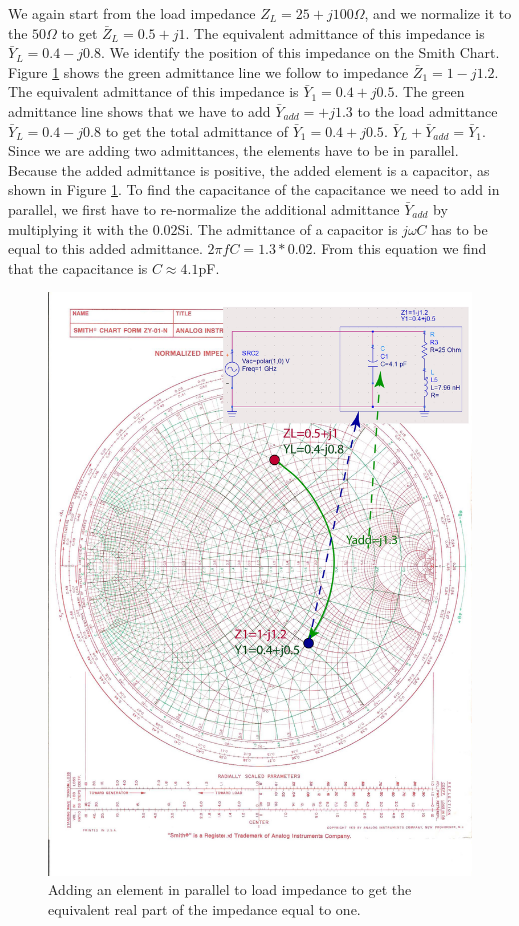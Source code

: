 \documentclass{ximera}
\begin{document}
We again start from the load impedance  $Z_L=25+j 100 \Omega$, and we normalize it to the $50 \Omega$ to get $\bar{Z}_L=0.5+j1$. The equivalent admittance of this impedance is $\bar{Y}_L=0.4-j0.8$. We identify the position of this impedance on the Smith Chart. Figure \ref{fig:LumpedImpM1} shows the green admittance line we follow to impedance $\bar{Z}_1=1-j1.2$. The equivalent admittance of this impedance is   $\bar{Y}_1=0.4+j0.5$. The green admittance line shows that we have to add $\bar{Y}_{add}=+j1.3$ to the load admittance $\bar{Y}_L=0.4-j0.8$ to get the total admittance of $\bar{Y}_1=0.4+j0.5$. $\bar{Y}_L+\bar{Y}_{add}=\bar{Y}_1$. Since we are adding two admittances, the elements have to be in parallel. Because the added admittance is positive, the added element is a capacitor, as shown in Figure \ref{fig:LumpedImpM1}. To find the capacitance of the capacitance we need to add in parallel, we first have to re-normalize the additional admittance $\bar{Y}_{add}$ by multiplying it with the $0.02$Si. The admittance of a capacitor is $j \omega C$ has to be equal to this added admittance. $2 \pi f C = 1.3* 0.02$. From this equation we find that the capacitance is $C \approx 4.1$pF. 
 


\begin{figure}[htbp]
\begin{center}
\includegraphics[scale=0.4]{../jpg/LumpedMatch1.jpg}
\end{center}
\caption{Adding an element in parallel to load impedance to get the equivalent real part of the impedance equal to one.}
\label{fig:LumpedImpM1}
\end{figure}
\end{document}
